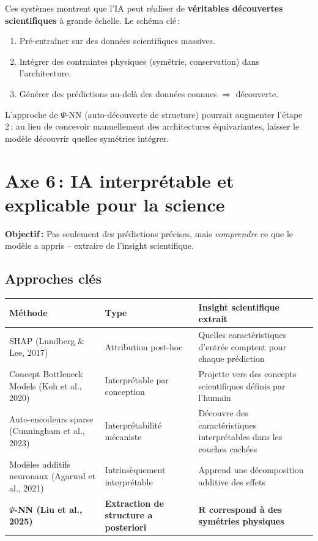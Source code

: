 \documentclass[11pt,a4paper]{article}
\begin{document}
Ces systèmes montrent que l'IA peut réaliser de \textbf{véritables découvertes scientifiques} à grande échelle. Le schéma clé\,:
\begin{enumerate}[leftmargin=1.8em,itemsep=2pt]
\item Pré-entraîner sur des données scientifiques massives.
\item Intégrer des contraintes physiques (symétrie, conservation) dans l'architecture.
\item Générer des prédictions au-delà des données connues $\Rightarrow$ découverte.
\end{enumerate}

L'approche de $\Psi$-NN (auto-découverte de structure) pourrait augmenter l'étape 2\,: au lieu de concevoir manuellement des architectures équivariantes, laisser le modèle découvrir quelles symétries intégrer.

\section{Axe 6\,: IA interprétable et explicable pour la science}

\textbf{Objectif\,:} Pas seulement des prédictions précises, mais \emph{comprendre} ce que le modèle a appris -- extraire de l'insight scientifique.

\subsection{Approches clés}

\begin{center}
\renewcommand{\arraystretch}{1.3}
\begin{tabular}{@{}p{3.5cm} p{3cm} p{6cm}@{}}
\toprule
\textbf{Méthode} & \textbf{Type} & \textbf{Insight scientifique extrait} \\
\midrule
SHAP (Lundberg \& Lee, 2017) & Attribution post-hoc & Quelles caractéristiques d'entrée comptent pour chaque prédiction \\
\addlinespace
Concept Bottleneck Models (Koh et al., 2020) & Interprétable par conception & Projette vers des concepts scientifiques définis par l'humain \\
\addlinespace
Auto-encodeurs sparse (Cunningham et al., 2023) & Interprétabilité mécaniste & Découvre des caractéristiques interprétables dans les couches cachées \\
\addlinespace
Modèles additifs neuronaux (Agarwal et al., 2021) & Intrinsèquement interprétable & Apprend une décomposition additive des effets \\
\addlinespace
\textbf{$\Psi$-NN (Liu et al., 2025)} & \textbf{Extraction de structure a posteriori} & \textbf{$\mathbf{R}$ correspond à des symétries physiques} \\
\bottomrule
\end{tabular}
\end{center}
\end{document}
